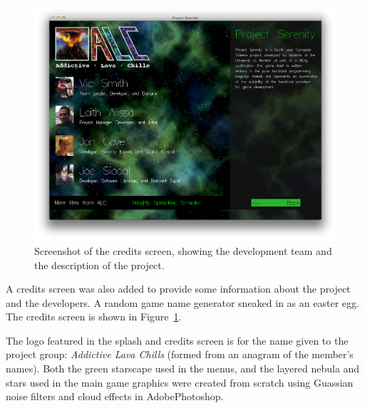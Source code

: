 \begin{figure}[t]
	\hspace{-2.5em}\includegraphics[width=17cm]{res/serenityscreens/05-credits}
	\caption[Screenshot of the credits screen]{Screenshot of the credits screen, showing the development team and the description of the project. }
	\label{fig:credits}
\end{figure}

A credits screen was also added to provide some information about the project and the developers. A random game name generator sneaked in as an easter egg. The credits screen is shown in Figure~\ref{fig:credits}.

The logo featured in the splash and credits screen is for the name given to the project group: \emph{Addictive Lava Chills} (formed from an anagram of the member's names). 
Both the green starscape used in the menus, and the layered nebula and stars used in the main game graphics were created from scratch using Guassian noise filters and cloud effects in Adobe\textregistered Photoshop.
